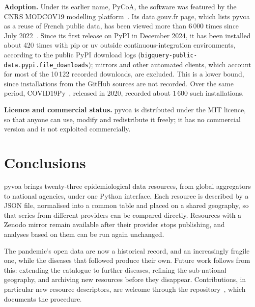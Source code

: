 \documentclass[preprint,12pt,a4paper]{elsarticle}
\begin{document}

\textbf{Adoption.} Under its earlier name, PyCoA, the software was featured
by the CNRS MODCOV19 modelling platform~\cite{modcov19}. Its data.gouv.fr
page, which lists pyvoa as a reuse of French public data, has been viewed
more than 6\,000 times since July 2022~\cite{datagouv_pyvoa}.
Since its first release on PyPI in December 2024,
it has been installed about 420 times with pip or uv outside
continuous-integration environments, according to the public PyPI download
logs (\texttt{bigquery-public-data.pypi.file\_downloads}); mirrors and other
automated clients, which account for most of the 10\,122 recorded downloads,
are excluded. This is a lower bound, since installations from the GitHub
sources are not recorded. Over the same period, COVID19Py~\cite{covid19py},
released in 2020, recorded about 1\,600 such installations.

\textbf{Licence and commercial status.} pyvoa is distributed under the MIT
licence, so that anyone can use, modify and redistribute it freely; it has no
commercial version and is not exploited commercially.



\section{Conclusions}
\label{sec:conclusions}

pyvoa brings twenty-three epidemiological data resources, from global
aggregators to national agencies, under one Python interface. Each resource
is described by a JSON file, normalised into a common table and placed on a
shared geography, so that series from different providers can be compared
directly. Resources with a Zenodo mirror remain available after their
provider stops publishing, and analyses based on them can be run again
unchanged. 

The pandemic's open data are now a historical record, and an increasingly
fragile one, while the diseases that followed produce their own. Future work
follows from this: extending the catalogue to further diseases, refining the
sub-national geography, and archiving new resources before they disappear.
Contributions, in particular new resource descriptors, are welcome through
the repository~\cite{pyvoa_github}, which documents the procedure.
\end{document}
